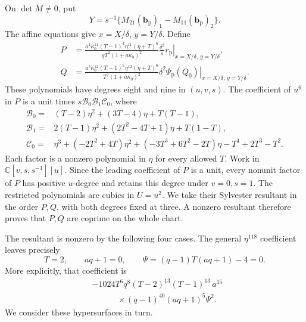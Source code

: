 \documentclass[11pt,a4paper]{article}
\numberwithin{equation}{section}
\theoremstyle{plain}
\theoremstyle{definition}
\theoremstyle{remark}
\begin{document}
On $\det M\ne0$, put
\[
 Y=s^{-1}\{M_{21}(\mathbf b_{\mathrm p})_1
              -M_{11}(\mathbf b_{\mathrm p})_2\}.
\]
The affine equations give $x=X/\delta$, $y=Y/\delta$. Define
\[
\begin{aligned}
 P&=\frac{a^4\kappa_0^{11}(T-1)^4\eta^{11}(\eta+T)^6}
          {qT^3(1+a\kappa_0)^2}
       \frac{\delta^2}{s}
       \left.r_{\mathrm p}\right|_{x=X/\delta,\,y=Y/\delta},\\
 Q&=\frac{a^5\kappa_0^{12}(T-1)^5\eta^{12}(\eta+T)^6}
          {T^2(1+a\kappa_0)^2}
       \delta^2
       \left.\Psi_{\mathrm p}(Q_0)\right|_{x=X/\delta,\,y=Y/\delta}.
\end{aligned}
\]
These polynomials have degrees eight and nine in $(u,v,s)$.
The coefficient of $u^6$ in $P$ is a unit times
$s\mathcal B_0\mathcal B_1\mathcal C_0$, where
\[
\begin{split}
 \mathcal B_0={}&(T-2)\eta^2+(3T-4)\eta+T(T-1),\\
 \mathcal B_1={}&2(T-1)\eta^2+(2T^2-4T+1)\eta+T(1-T),\\
 \mathcal C_0={}&\eta^3+(-2T^2+4T)\eta^2
       +(-3T^3+6T^2-2T)\eta-T^4+2T^3-T^2.
\end{split}
\]
Each factor is a nonzero polynomial in \(\eta\) for every allowed \(T\).
Work in \(\mathbb C[v,s,s^{-1}][u]\).  Since the leading coefficient of
\(P\) is a unit, every nonunit factor of \(P\) has positive \(u\)-degree
and retains this degree under \(v=0,s=1\).
The restricted polynomials are cubics in $U=u^2$.
We take their Sylvester resultant in the order $P,Q$, with both
degrees fixed at three. A nonzero resultant therefore proves
that $P,Q$ are coprime on the whole chart.

The resultant is nonzero by the following four cases.  The general
\(\eta^{118}\) coefficient leaves precisely
\[
 T=2,\qquad aq+1=0,\qquad \Psi=(q-1)T(aq+1)-4=0.
\]
More explicitly, that coefficient is
\[
 \begin{aligned}
 &-1024T^6q^8(T-2)^{13}(T-1)^{13}\,a^{15}\,\\
 &\hspace{3em}{}\times(q-1)^{40}(aq+1)^5\Psi^2.
 \end{aligned}
\]
We consider these hypersurfaces in turn.
\end{document}
